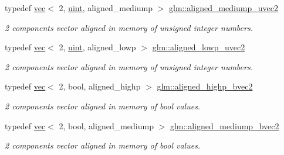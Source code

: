 \begin{DoxyCompactItemize}
typedef \hyperlink{structglm_1_1vec}{vec}$<$ 2, \hyperlink{group__core__precision_ga4fd29415871152bfb5abd588334147c8}{uint}, aligned\+\_\+mediump $>$ \hyperlink{group__gtc__type__aligned_gacb673fdb5622c457d9f8ec669bc32842}{glm\+::aligned\+\_\+mediump\+\_\+uvec2}
\begin{DoxyCompactList}\small\item\em 2 components vector aligned in memory of unsigned integer numbers. \end{DoxyCompactList}\item 
\mbox{\label{group__gtc__type__aligned_gabd374d47967c0eefc8b98a405d064cc6}} 
typedef \hyperlink{structglm_1_1vec}{vec}$<$ 2, \hyperlink{group__core__precision_ga4fd29415871152bfb5abd588334147c8}{uint}, aligned\+\_\+lowp $>$ \hyperlink{group__gtc__type__aligned_gabd374d47967c0eefc8b98a405d064cc6}{glm\+::aligned\+\_\+lowp\+\_\+uvec2}
\begin{DoxyCompactList}\small\item\em 2 components vector aligned in memory of unsigned integer numbers. \end{DoxyCompactList}\item 
\mbox{\label{group__gtc__type__aligned_gafa71bded1fc2dd68608207de49a96870}} 
typedef \hyperlink{structglm_1_1vec}{vec}$<$ 2, bool, aligned\+\_\+highp $>$ \hyperlink{group__gtc__type__aligned_gafa71bded1fc2dd68608207de49a96870}{glm\+::aligned\+\_\+highp\+\_\+bvec2}
\begin{DoxyCompactList}\small\item\em 2 components vector aligned in memory of bool values. \end{DoxyCompactList}\item 
\mbox{\label{group__gtc__type__aligned_gae5c5d40c3d652a0f882f5f634914cfc9}} 
typedef \hyperlink{structglm_1_1vec}{vec}$<$ 2, bool, aligned\+\_\+mediump $>$ \hyperlink{group__gtc__type__aligned_gae5c5d40c3d652a0f882f5f634914cfc9}{glm\+::aligned\+\_\+mediump\+\_\+bvec2}
\begin{DoxyCompactList}\small\item\em 2 components vector aligned in memory of bool values. \end{DoxyCompactList}\item 
\mbox{\label{group__gtc__type__aligned_ga8118d4ac245590bb8c4dfcad9b7632ee}} 

\end{DoxyCompactItemize}
